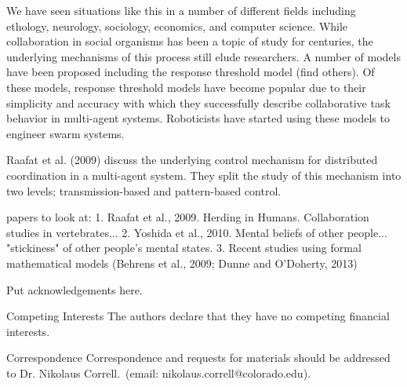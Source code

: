 \documentclass{nature}
\begin{document}
We have seen situations like this in a number of different fields including ethology, neurology, sociology, economics, and computer science. While collaboration in social organisms has been a topic of study for centuries, the underlying mechanisms of this process still elude researchers. A number of models have been proposed including the response threshold model (find others). Of these models, response threshold models have become popular due to their simplicity and accuracy with which they successfully describe collaborative task behavior in multi-agent systems. Roboticists have started using these models to engineer swarm systems.

Raafat et al. (2009) discuss the underlying control mechanism for distributed coordination in a multi-agent system. They split the study of this mechanism into two levels; transmission-based and pattern-based control. 




papers to look at:
1. Raafat et al., 2009. Herding in Humans. Collaboration studies in vertebrates...
2. Yoshida et al., 2010. Mental beliefs of other people...  "stickiness" of other people's mental states.
3. Recent studies using formal mathematical models (Behrens et al., 2009; Dunne and O’Doherty, 2013)






\begin{addendum}
 \item Put acknowledgements here.
 \item[Competing Interests] The authors declare that they have no
competing financial interests.
 \item[Correspondence] Correspondence and requests for materials
should be addressed to Dr. Nikolaus Correll.~(email: nikolaus.correll@colorado.edu).
\end{addendum}

\end{document}
